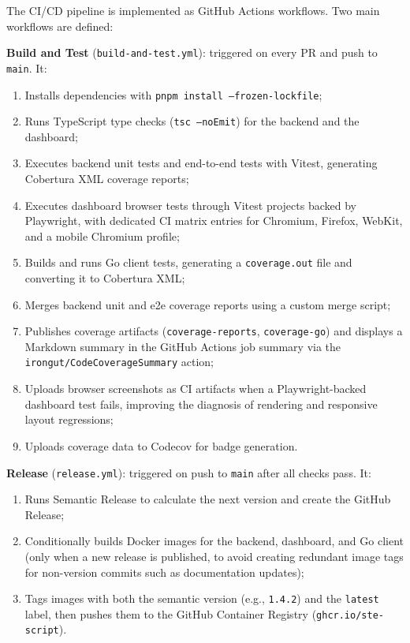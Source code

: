 \documentclass[12pt]{report}
\begin{document}
The CI/CD pipeline is implemented as GitHub Actions workflows. Two main
workflows are defined:

\textbf{Build and Test} (\texttt{build-and-test.yml}): triggered on every PR
and push to \texttt{main}. It:
\begin{enumerate}
  \item Installs dependencies with \texttt{pnpm install --frozen-lockfile};
  \item Runs TypeScript type checks (\texttt{tsc --noEmit}) for the backend and
    the dashboard;
  \item Executes backend unit tests and end-to-end tests with Vitest, generating
    Cobertura XML coverage reports;
  \item Executes dashboard browser tests through Vitest projects backed by
    Playwright, with dedicated CI matrix entries for Chromium, Firefox,
    WebKit, and a mobile Chromium profile;
  \item Builds and runs Go client tests, generating a \texttt{coverage.out} file
    and converting it to Cobertura XML;
  \item Merges backend unit and e2e coverage reports using a custom merge script;
  \item Publishes coverage artifacts (\texttt{coverage-reports},
    \texttt{coverage-go}) and displays a Markdown summary in the GitHub Actions
    job summary via the \texttt{irongut/CodeCoverageSummary} action;
  \item Uploads browser screenshots as CI artifacts when a Playwright-backed
    dashboard test fails, improving the diagnosis of rendering and responsive
    layout regressions;
  \item Uploads coverage data to Codecov for badge generation.
\end{enumerate}

\textbf{Release} (\texttt{release.yml}): triggered on push to \texttt{main}
after all checks pass. It:
\begin{enumerate}
  \item Runs Semantic Release to calculate the next version and create the
    GitHub Release;
  \item Conditionally builds Docker images for the backend, dashboard, and Go
    client (only when a new release is published, to avoid creating redundant
    image tags for non-version commits such as documentation updates);
  \item Tags images with both the semantic version (e.g., \texttt{1.4.2}) and
    the \texttt{latest} label, then pushes them to the GitHub Container Registry
    (\texttt{ghcr.io/ste-script}).
\end{enumerate}
\end{document}
